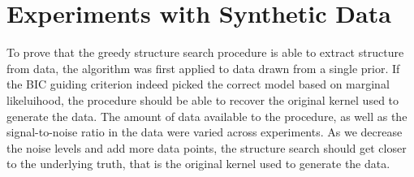 \documentclass[a4paper,12pt ]{report}
\begin{document}
\section{Experiments with Synthetic Data}

To prove that the greedy structure search procedure is able to extract structure from data, the algorithm was first applied to data drawn from a single \gp{} prior. If the BIC guiding criterion indeed picked the correct 
model based on marginal likeluihood, the procedure should be able to recover the original kernel used to generate the data. The amount of data available to the procedure, as well as the signal-to-noise ratio in the data were varied across experiments. 
As we decrease the noise levels and add more data points, the structure search should get closer to the underlying truth, that is the original kernel used to generate the data.
\end{document}
